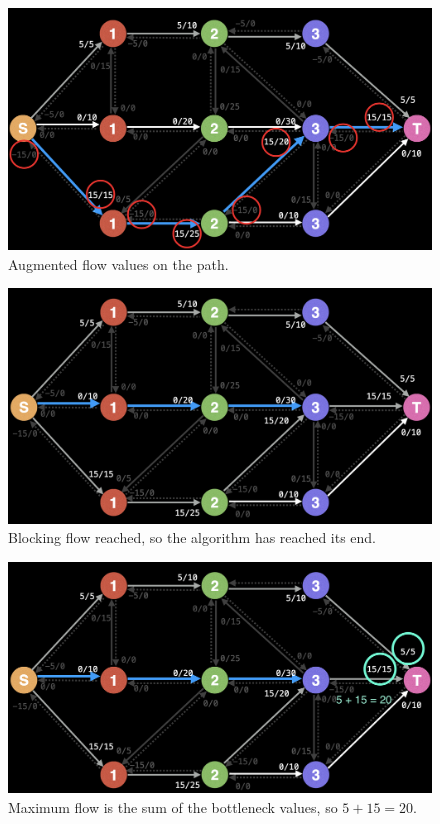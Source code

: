 \documentclass{report}
\begin{document}
\begin{figure}[!htb]
    \includegraphics[width=\textwidth]{assets/visual06.png}
    \centering
    \captionsetup{justification=centering,margin=2cm}
    \caption{Augmented flow values on the path.}
\end{figure}
\pagebreak
\begin{figure}[!htb]
    \includegraphics[width=\textwidth]{assets/visual07.png}
    \centering
    \captionsetup{justification=centering,margin=2cm}
    \caption{Blocking flow reached, so the algorithm has reached its end.}
\end{figure}
\begin{figure}[!htb]
    \includegraphics[width=\textwidth]{assets/visual08.png}
    \centering
    \captionsetup{justification=centering,margin=2cm}
    \caption{Maximum flow is the sum of the bottleneck values, so $5 + 15 = 20$.}
\end{figure}
\pagebreak
\end{document}
